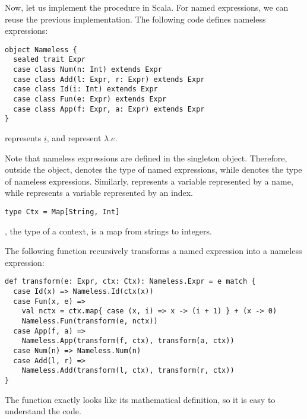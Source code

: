 Now, let us implement the procedure in Scala. For named expressions, we can
reuse the previous implementation. The following code defines nameless
expressions:

\begin{verbatim}
object Nameless {
  sealed trait Expr
  case class Num(n: Int) extends Expr
  case class Add(l: Expr, r: Expr) extends Expr
  case class Id(i: Int) extends Expr
  case class Fun(e: Expr) extends Expr
  case class App(f: Expr, a: Expr) extends Expr
}
\end{verbatim}

 represents $\underline{i}$, and
 represent $\lambda.e$.

Note that nameless expressions are defined in the  singleton object.
Therefore, outside the object,  denotes the type of named
expressions, while  denotes the type of nameless
expressions. Similarly,  represents a variable represented by a name,
while  represents a variable represented by an index.

\begin{verbatim}
type Ctx = Map[String, Int]
\end{verbatim}

, the type of a context, is a map from strings to integers.

The following  function recursively transforms a named expression
into a nameless expression:

\begin{verbatim}
def transform(e: Expr, ctx: Ctx): Nameless.Expr = e match {
  case Id(x) => Nameless.Id(ctx(x))
  case Fun(x, e) =>
    val nctx = ctx.map{ case (x, i) => x -> (i + 1) } + (x -> 0)
    Nameless.Fun(transform(e, nctx))
  case App(f, a) =>
    Nameless.App(transform(f, ctx), transform(a, ctx))
  case Num(n) => Nameless.Num(n)
  case Add(l, r) =>
    Nameless.Add(transform(l, ctx), transform(r, ctx))
}
\end{verbatim}

The function exactly looks like its mathematical definition, so it is easy to
understand the code.

